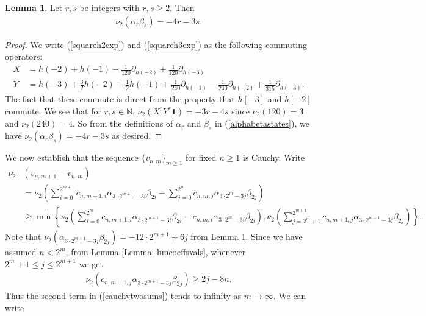 \documentclass[10pt,a4paper]{amsart}
\numberwithin{equation}{section}
\theoremstyle{definition}
\newtheorem{Lemma}[Th]{Lemma}
\begin{document}
\begin{Lemma} \label{Lemma: alphabetaval}
    Let $r,s$ be integers with $r,s \geq 2$. Then
    \begin{align*}
        \nu_{2} \left( \alpha_{r} \beta_{s} \right) = -4r-3s.
    \end{align*}
\end{Lemma}
\begin{proof}
    We write (\ref{squareh2exp}) and (\ref{squareh3exp}) as the following commuting operators:
    \begin{align*}
        X &= h(-2) + h(-1) - \frac{1}{120}\partial_{h(-2)} + \frac{1}{120} \partial_{h(-3)} \\
        Y &= h(-3) + \frac{3}{2}h(-2) + \frac{1}{2}h(-1) + \frac{1}{240} \partial_{h(-1)} - \frac{1}{240}\partial_{h(-2)} + \frac{1}{315} \partial_{h(-3)}.
    \end{align*}
    The fact that these commute is direct from the property that $h[-3]$ and $h[-2]$ commute. We see that for $r,s \in \mathbb{N}$, $\nu_{2}(X^{r}Y^{s}\textbf{1}) = -3r-4s$ since $\nu_{2}(120)=3$ and $\nu_{2}(240)=4$. So from the definitions of $\alpha_{r}$ and $\beta_{s}$ in (\ref{alphabetastates}), we have $\nu_{2}(\alpha_{r}\beta_{s}) = -4r-3s$ as desired.
\end{proof}
\noindent We now establish that the sequence $\lbrace v_{n,m} \rbrace_{m \geq 1}$ for fixed $n \geq 1$ is Cauchy. Write
\begin{align}
    \nu_{2}&(v_{n,m+1} - v_{n,m}) \nonumber \\
    &= \nu_{2}\left( \sum_{i=0}^{2^{m+1}} c_{n,m+1,i}\alpha_{3 \cdot 2^{m+1}-3i}\beta_{2i} - \sum_{j=0}^{2^{m}} c_{n,m,j} \alpha_{3\cdot 2^{m}-3j}\beta_{2j} \right) \nonumber \\
    &\geq \min \left\lbrace \nu_{2}\left( \sum_{i=0}^{2^{m}} c_{n,m+1,i}\alpha_{3\cdot 2^{m+1}-3i} \beta_{2i} - c_{n,m,i}\alpha_{3\cdot 2^{m}-3i}\beta_{2i} \right), \nu_{2}\left(\sum_{j=2^{m}+1}^{2^{m+1}} c_{n,m+1,j}\alpha_{3\cdot 2^{m+1}-3j}\beta_{2j} \right) \right\rbrace. \label{cauchytwosums}
\end{align}
Note that $\nu_{2}(\alpha_{3\cdot 2^{m+1}-3j}\beta_{2j}) = -12\cdot 2^{m+1}+6j$ from Lemma \ref{Lemma: alphabetaval}. Since we have assumed $n < 2^{m}$, from Lemma \ref{Lemma: hmcoeffsvals}, whenever $2^{m}+1 \leq j \leq 2^{m+1}$ we get
\begin{align*}
    \nu_{2}(c_{n,m+1,j}\alpha_{3\cdot 2^{m+1}-3j}\beta_{2j}) \geq 2 j -8n.
\end{align*}
Thus the second term in (\ref{cauchytwosums}) tends to infinity as $m \to \infty$. We can write
\end{document}
